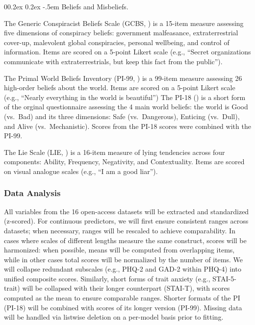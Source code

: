 \documentclass[
  jou,
  floatsintext,
  longtable,
  nolmodern,
  notxfonts,
  notimes,
  colorlinks=true,linkcolor=blue,citecolor=blue,urlcolor=blue]{apa7}
\makeatletter
\renewcommand{\paragraph}{\@startsection{paragraph}{4}{\parindent}%
	{0\baselineskip \@plus 0.2ex \@minus 0.2ex}%
	{-.5em}%
	{\normalfont\normalsize\bfseries\typesectitle}}
\makeatother
\begin{document}
\paragraph{Beliefs and Misbeliefs.}\label{beliefs-and-misbeliefs}

The Generic Conspiracist Beliefs Scale (GCBS,
) is a
15-item measure assessing five dimensions of conspiracy beliefs:
government malfeasance, extraterrestrial cover-up, malevolent global
conspiracies, personal wellbeing, and control of information. Items are
scored on a 5-point Likert scale (e.g., ``Secret organizations
communicate with extraterrestrials, but keep this fact from the
public'').

The Primal World Beliefs Inventory (PI-99,
) is a 99-item
measure assessing 26 high-order beliefs about the world. Items are
scored on a 5-point Likert scale (e.g., ``Nearly everything in the world
is beautiful'') The PI-18 () is a short form of the orginal questionnaire assessing the
4 main world beliefs: the world is Good (vs.~Bad) and its three
dimensions: Safe (vs.~Dangerous), Enticing (vs.~Dull), and Alive
(vs.~Mechanistic). Scores from the PI-18 scores were combined with the
PI-99.

The Lie Scale (LIE, ) is a 16-item measure of lying tendencies across four
components: Ability, Frequency, Negativity, and Contextuality. Items are
scored on visual analogue scales (e.g., ``I am a good liar'').

\subsubsection{Data Analysis}\label{data-analysis-1}

All variables from the 16 open-access datasets will be extracted and
standardized (z-scored). For continuous predictors, we will first ensure
consistent ranges across datasets; when necessary, ranges will be
rescaled to achieve comparability. In cases where scales of different
lengths measure the same construct, scores will be harmonized: when
possible, means will be computed from overlapping items, while in other
cases total scores will be normalized by the number of items. We will
collapse redundant subscales (e.g., PHQ-2 and GAD-2 within PHQ-4) into
unified composite scores. Similarly, short forms of trait anxiety (e.g.,
STAI-5-trait) will be collapsed with their longer counterpart (STAI-T),
with scores computed as the mean to ensure comparable ranges. Shorter
formats of the PI (PI-18) will be combined with scores of its longer
version (PI-99). Missing data will be handled via listwise deletion on a
per-model basis prior to fitting.
\end{document}
